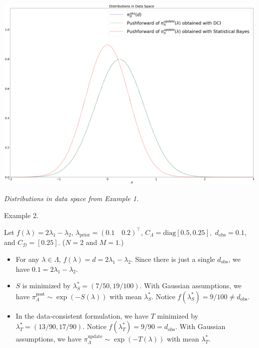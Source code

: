 \documentclass[11pt]{beamer}
\begin{document}
\begin{frame}

\begin{center} 
\includegraphics[scale=0.125]{data}

\textit{Distributions in data space from Example 1.}
\end{center}

\end{frame}


\begin{frame}

\begin{block}{Example 2. \footnotemark[1]}


\noindent  Let $f(\lambda)=2\lambda_1-\lambda_2$, $\lambda_\text{prior}=(0.1 \quad 0.2)^\top$, $C_\Lambda=\text{diag}[0.5,0.25],$ $d_\text{obs}=0.1$, and $C_\mathcal{D}=[0.25]$. ($N=2$ and $M=1$.)

\begin{itemize}


 \item For any $\lambda \in \Lambda$, $f(\lambda)=d=2\lambda_1-\lambda_2$. Since there is just a single $d_\text{obs}$, we have $0.1=2\lambda_1-\lambda_2$.



	\item $S$ is minimized by $\lambda^*_S=(7/50,19/100)$. 
With Gaussian assumptions, we have $\pi_\Lambda^\text{post} \sim \exp(-S(\lambda))$ with mean $\lambda_S^*$. Notice $f(\lambda^*_S)=9/100\neq d_\text{obs}$. 

 
	\item In the data-consistent formulation, we have 
$T$ minimized by $\lambda^*_T=(13/90,17/90)$. Notice $f(\lambda^*_T)=9/90=d_\text{obs}$. With Gaussian assumptions, we have $\pi_\Lambda^\text{update} \sim \exp(-T(\lambda))$ with mean $\lambda_T^*$. 


\end{itemize}


\end{block}


\end{frame}
\end{document}
